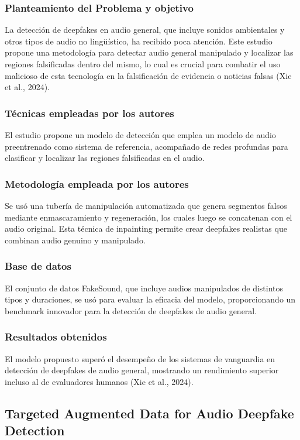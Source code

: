 \subsubsection{Planteamiento del Problema y objetivo }
La detección de deepfakes en audio general, que incluye sonidos ambientales y otros tipos de audio no lingüístico, ha recibido poca atención. Este estudio propone una metodología para detectar audio general manipulado y localizar las regiones falsificadas dentro del mismo, lo cual es crucial para combatir el uso malicioso de esta tecnología en la falsificación de evidencia o noticias falsas (Xie et al., 2024).

\subsubsection{Técnicas empleadas por los autores}
El estudio propone un modelo de detección que emplea un modelo de audio preentrenado como sistema de referencia, acompañado de redes profundas para clasificar y localizar las regiones falsificadas en el audio.

\subsubsection{Metodología empleada por los autores}
Se usó una tubería de manipulación automatizada que genera segmentos falsos mediante enmascaramiento y regeneración, los cuales luego se concatenan con el audio original. Esta técnica de inpainting permite crear deepfakes realistas que combinan audio genuino y manipulado.

\subsubsection{Base de datos}
El conjunto de datos FakeSound, que incluye audios manipulados de distintos tipos y duraciones, se usó para evaluar la eficacia del modelo, proporcionando un benchmark innovador para la detección de deepfakes de audio general.

\subsubsection{Resultados obtenidos}
El modelo propuesto superó el desempeño de los sistemas de vanguardia en detección de deepfakes de audio general, mostrando un rendimiento superior incluso al de evaluadores humanos (Xie et al., 2024).

\subsection{Targeted Augmented Data for Audio Deepfake Detection \citep*{astrid2024augmentation}}

